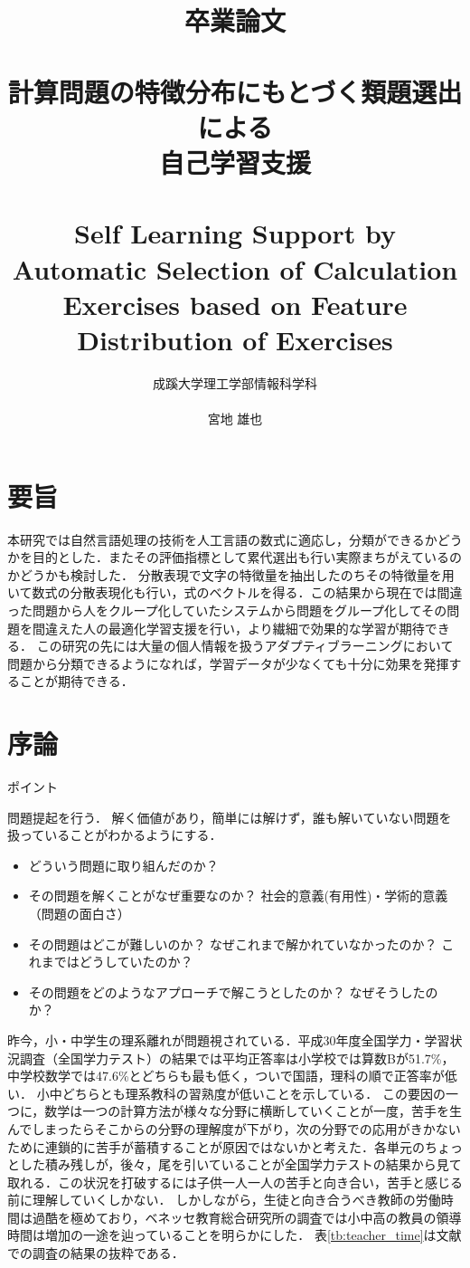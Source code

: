 \documentclass[a4j,11pt,report]{jsbook}
\title{卒業論文\\　\vspace{3em}\\{\huge #1}\\　\\#2\vspace{15em}}%
\author{{\huge 成蹊大学理工学部情報科学科}\\　\\{\huge #3}}%
\date{}
\newcommand{\frontpage}[3]{%
\title{卒業論文\\　\vspace{3em}\\{\huge #1}\\　\\#2\vspace{15em}}%
\author{{\huge 成蹊大学理工学部情報科学科}\\　\\{\huge #3}}%
\date{}
\maketitle
\clearpage
\thispagestyle{empty}

\clearpage
}
\newcommand{\point}[1]{
\begin{itembox}[l]{ポイント}
  #1
\end{itembox}
}
\begin{document}
\frontpage  %
{計算問題の特徴分布にもとづく類題選出による\\自己学習支援}
{Self Learning Support by Automatic Selection of Calculation Exercises based on Feature Distribution of Exercises}
{宮地 雄也}



\chapter*{要旨}
\thispagestyle{empty}

本研究では自然言語処理の技術を人工言語の数式に適応し，分類ができるかどうかを目的とした．またその評価指標として累代選出も行い実際まちがえているのかどうかも検討した．
分散表現で文字の特徴量を抽出したのちその特徴量を用いて数式の分散表現化も行い，式のベクトルを得る．この結果から現在では間違った問題から人をクループ化していたシステムから問題をグループ化してその問題を間違えた人の最適化学習支援を行い，より繊細で効果的な学習が期待できる．
この研究の先には大量の個人情報を扱うアダプティブラーニングにおいて問題から分類できるようになれば，学習データが少なくても十分に効果を発揮することが期待できる．


\tableofcontents
\thispagestyle{empty}
\clearpage
\thispagestyle{plain}
\setcounter{page}{1}

\chapter{序論 \label{ch:introduction}}

\point{
問題提起を行う．
解く価値があり，簡単には解けず，誰も解いていない問題を扱っていることがわかるようにする．
\begin{itemize}
  \item どういう問題に取り組んだのか？
  \item その問題を解くことがなぜ重要なのか？ 社会的意義(有用性)・学術的意義（問題の面白さ）
  \item その問題はどこが難しいのか？ なぜこれまで解かれていなかったのか？ これまではどうしていたのか？
  \item その問題をどのようなアプローチで解こうとしたのか？ なぜそうしたのか？
\end{itemize}
}
\fi

昨今，小・中学生の理系離れが問題視されている．平成30年度全国学力・学習状況調査（全国学力テスト）の結果では平均正答率は小学校では算数Bが51.7\%，中学校数学では47.6\%とどちらも最も低く，ついで国語，理科の順で正答率が低い．
小中どちらとも理系教科の習熟度が低いことを示している．
この要因の一つに，数学は一つの計算方法が様々な分野に横断していくことが一度，苦手を生んでしまったらそこからの分野の理解度が下がり，次の分野での応用がきかないために連鎖的に苦手が蓄積することが原因ではないかと考えた．各単元のちょっとした積み残しが，後々，尾を引いていることが全国学力テストの結果から見て取れる．この状況を打破するには子供一人一人の苦手と向き合い，苦手と感じる前に理解していくしかない．
しかしながら，生徒と向き合うべき教師の労働時間は過酷を極めており，ベネッセ教育総合研究所の調査では小中高の教員の領導時間は増加の一途を辿っていることを明らかにした．
表\ref{tb:teacher_time}は文献\cite{benesse_DateBook}での調査の結果の抜粋である．
\end{document}
